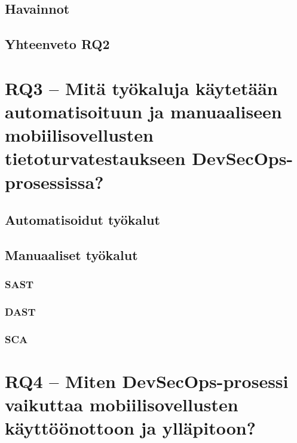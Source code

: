 \documentclass[bscthesis,finnish,oneside,biblatex]{uefcsthesis}
\begin{document}
\subsection{Havainnot}

\subsection{Yhteenveto RQ2}

\section{RQ3 – Mitä työkaluja käytetään automatisoituun ja manuaaliseen mobiilisovellusten tietoturvatestaukseen DevSecOps-prosessissa?}
\label{sec:rq3}


\subsection{Automatisoidut työkalut}

\subsection{Manuaaliset työkalut}

\subsubsection{SAST}

\subsubsection{DAST}

\subsubsection{SCA}

\section{RQ4 – Miten DevSecOps-prosessi vaikuttaa mobiilisovellusten käyttöönottoon ja ylläpitoon?}
\label{sec:rq4}

\end{document}
